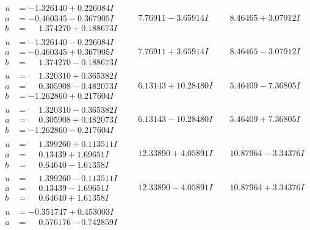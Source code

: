 \documentclass[1p]{elsarticle_modified}
\theoremstyle{definition}
\begin{document}
$$\begin{array}{c|c|c}
\begin{aligned}
u &= -1.326140 + 0.226084 I \\
a &= -0.460345 - 0.367905 I \\
b &= \phantom{-}1.374270 + 0.188673 I\end{aligned}
 & \phantom{-}7.76911 - 3.65914 I & \phantom{-}8.46465 + 3.07912 I \\ \hline\begin{aligned}
u &= -1.326140 - 0.226084 I \\
a &= -0.460345 + 0.367905 I \\
b &= \phantom{-}1.374270 - 0.188673 I\end{aligned}
 & \phantom{-}7.76911 + 3.65914 I & \phantom{-}8.46465 - 3.07912 I \\ \hline\begin{aligned}
u &= \phantom{-}1.320310 + 0.365382 I \\
a &= \phantom{-}0.305908 - 0.482073 I \\
b &= -1.262860 + 0.217604 I\end{aligned}
 & \phantom{-}6.13143 + 10.28480 I & \phantom{-}5.46409 - 7.36805 I \\ \hline\begin{aligned}
u &= \phantom{-}1.320310 - 0.365382 I \\
a &= \phantom{-}0.305908 + 0.482073 I \\
b &= -1.262860 - 0.217604 I\end{aligned}
 & \phantom{-}6.13143 - 10.28480 I & \phantom{-}5.46409 + 7.36805 I \\ \hline\begin{aligned}
u &= \phantom{-}1.399260 + 0.113511 I \\
a &= \phantom{-}0.13439 + 1.69651 I \\
b &= \phantom{-}0.64640 - 1.61358 I\end{aligned}
 & \phantom{-}12.33890 + 4.05891 I & \phantom{-}10.87964 - 3.34376 I \\ \hline\begin{aligned}
u &= \phantom{-}1.399260 - 0.113511 I \\
a &= \phantom{-}0.13439 - 1.69651 I \\
b &= \phantom{-}0.64640 + 1.61358 I\end{aligned}
 & \phantom{-}12.33890 - 4.05891 I & \phantom{-}10.87964 + 3.34376 I \\ \hline\begin{aligned}
u &= -0.351747 + 0.453003 I \\
a &= \phantom{-}0.576176 - 0.742859 I \\

\end{aligned}
\end{array}$$
\end{document}
